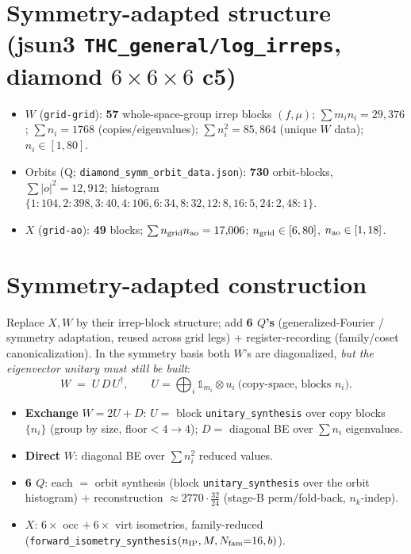 \documentclass[11pt]{article}
\newcommand{\code}[1]{\texttt{\small #1}}
\begin{document}
\section*{Symmetry-adapted structure (jsun3 \code{THC\_general/log\_irreps}, diamond $6{\times}6{\times}6$ c5)}
\begin{itemize}\itemsep0pt
\item $W$ (\code{grid-grid}): \textbf{57} whole-space-group irrep blocks $(f,\mu)$; $\sum m_i n_i=29{,}376$;
      $\sum n_i=1768$ (copies/eigenvalues); $\sum n_i^2=85{,}864$ (unique $W$ data); $n_i\in[1,80]$.
\item Orbits (Q; \code{diamond\_symm\_orbit\_data.json}): \textbf{730} orbit-blocks, $\sum|o|^2=12{,}912$;
      histogram $\{1{:}104,2{:}398,3{:}40,4{:}106,6{:}34,8{:}32,12{:}8,16{:}5,24{:}2,48{:}1\}$.
\item $X$ (\code{grid-ao}): \textbf{49} blocks; $\sum n_{\rm grid}n_{\rm ao}=17{,}006$; $n_{\rm grid}\in[6,80]$, $n_{\rm ao}\in[1,18]$.
\end{itemize}

\section*{Symmetry-adapted construction}
Replace $X,W$ by their irrep-block structure; add \textbf{6 $Q$'s} (generalized-Fourier / symmetry
adaptation, reused across grid legs) + register-recording (family/coset canonicalization). In the
symmetry basis both $W$'s are diagonalized, \emph{but the eigenvector unitary must still be built}:
\[
   W \;=\; U\,D\,U^\dagger,\qquad U=\bigoplus_i \mathbb 1_{m_i}\otimes u_i \ \text{(copy-space, blocks }n_i).
\]
\begin{itemize}\itemsep0pt
\item \textbf{Exchange} $W=2U+D$: $U=$ block \code{unitary\_synthesis} over copy blocks $\{n_i\}$
      (group by size, floor${<}4\!\to\!4$); $D=$ diagonal BE over $\sum n_i$ eigenvalues.
\item \textbf{Direct} $W$: diagonal BE over $\sum n_i^2$ reduced values.
\item \textbf{6 $Q$}: each $=$ orbit synthesis (block \code{unitary\_synthesis} over the orbit histogram)
      $+$ reconstruction $\approx 2770\cdot\tfrac{32}{24}$ (stage-B perm/fold-back, $n_k$-indep).
\item \textbf{$X$}: $6\times$ occ $+\ 6\times$ virt isometries, family-reduced (\code{forward\_isometry\_synthesis}$(n_{\rm IP},M,N_{\rm fam}{=}16,b)$).
\end{itemize}
\end{document}
